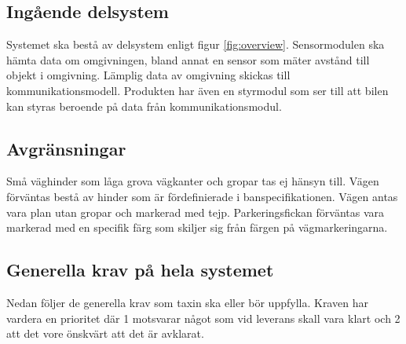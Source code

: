 \documentclass[kravspec/krav.tex]{subfiles}
\begin{document}
\subsection{Ingående delsystem}
Systemet ska bestå av delsystem enligt figur \ref{fig:overview}. Sensormodulen
ska hämta data om omgivningen, bland annat en sensor som mäter avstånd till
objekt i omgivning. Lämplig data av omgivning skickas till
kommunikationsmodell. Produkten har även en styrmodul som ser till att bilen
kan styras beroende på data från kommunikationsmodul.

\subsection{Avgränsningar}
Små väghinder som låga grova vägkanter och gropar tas ej hänsyn till. Vägen
förväntas bestå av hinder som är fördefinierade i banspecifikationen. Vägen
antas vara plan utan gropar och markerad med tejp. Parkeringsfickan förväntas
vara markerad med en specifik färg som skiljer sig från färgen på
vägmarkeringarna.

\subsection{Generella krav på hela systemet}
Nedan följer de generella krav som taxin ska eller bör uppfylla. Kraven har
vardera en prioritet där 1 motsvarar något som vid leverans skall vara klart
och 2 att det vore önskvärt att det är avklarat.
\end{document}
